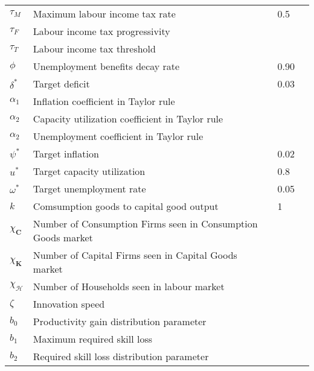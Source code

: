 \documentclass[a4paper, headings=standardclasses]{scrartcl}
\begin{document}
\begin{tabularx}{\linewidth}{lXll}
    $\tau_M$                     & Maximum labour income tax rate                               & 0.5   &        \\
    $\tau_F$                     & Labour income tax progressivity                              &       &        \\
    $\tau_T$                     & Labour income tax threshold                                  &       &        \\
    $\phi$                       & Unemployment benefits decay rate                             & 0.90  &        \\
    $\delta^*$                   & Target deficit                                               & 0.03  &        \\
    $\alpha_1$                   & Inflation coefficient in Taylor rule                         &       &        \\
    $\alpha_2$                   & Capacity utilization coefficient in Taylor rule              &       &        \\
    $\alpha_2$                   & Unemployment coefficient in Taylor rule                      &       &        \\
    $\psi^*$                     & Target inflation                                             & 0.02  &        \\
    $u^*$                        & Target capacity utilization                                  & 0.8   &        \\
    $\omega^*$                   & Target unemployment rate                                     & 0.05  &        \\
    $k$                          & Comsumption goods to capital good output                     & 1     &        \\
    $\chi_\mathbf{C}$            & Number of Consumption Firms seen in Consumption Goods market &       &        \\
    $\chi_\mathbf{K}$            & Number of Capital Firms seen in Capital Goods market         &       &        \\
    $\chi_\mathcal{H}$           & Number of Households seen in labour market                   &       &        \\
    $\zeta$                      & Innovation speed                                             &       &        \\
    $b_0$                        & Productivity gain distribution parameter                     &       &        \\
    $b_1$                        & Maximum required skill loss                                  &       &        \\
    $b_2$                        & Required skill loss distribution parameter                   &       &        \\


    \bottomrule
\end{tabularx}
\end{document}
